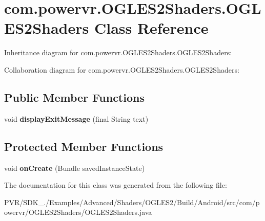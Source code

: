 \hypertarget{classcom_1_1powervr_1_1_o_g_l_e_s2_shaders_1_1_o_g_l_e_s2_shaders}{\section{com.\+powervr.\+O\+G\+L\+E\+S2\+Shaders.\+O\+G\+L\+E\+S2\+Shaders Class Reference}
\label{classcom_1_1powervr_1_1_o_g_l_e_s2_shaders_1_1_o_g_l_e_s2_shaders}
}


Inheritance diagram for com.\+powervr.\+O\+G\+L\+E\+S2\+Shaders.\+O\+G\+L\+E\+S2\+Shaders\+:


Collaboration diagram for com.\+powervr.\+O\+G\+L\+E\+S2\+Shaders.\+O\+G\+L\+E\+S2\+Shaders\+:
\subsection*{Public Member Functions}
\begin{DoxyCompactItemize}
\item 
\hypertarget{classcom_1_1powervr_1_1_o_g_l_e_s2_shaders_1_1_o_g_l_e_s2_shaders_a04f6cc070f6aca7f4e64b701bf9305c7}{void {\bfseries display\+Exit\+Message} (final String text)}\label{classcom_1_1powervr_1_1_o_g_l_e_s2_shaders_1_1_o_g_l_e_s2_shaders_a04f6cc070f6aca7f4e64b701bf9305c7}

\end{DoxyCompactItemize}
\subsection*{Protected Member Functions}
\begin{DoxyCompactItemize}
\item 
\hypertarget{classcom_1_1powervr_1_1_o_g_l_e_s2_shaders_1_1_o_g_l_e_s2_shaders_a3ea203cad9330481d1e2725542942e8d}{void {\bfseries on\+Create} (Bundle saved\+Instance\+State)}\label{classcom_1_1powervr_1_1_o_g_l_e_s2_shaders_1_1_o_g_l_e_s2_shaders_a3ea203cad9330481d1e2725542942e8d}

\end{DoxyCompactItemize}


The documentation for this class was generated from the following file\+:\begin{DoxyCompactItemize}
\item 
P\+V\+R/\+S\+D\+K\+\_./\+Examples/\+Advanced/\+Shaders/\+O\+G\+L\+E\+S2/\+Build/\+Android/src/com/powervr/\+O\+G\+L\+E\+S2\+Shaders/O\+G\+L\+E\+S2\+Shaders.\+java\end{DoxyCompactItemize}
